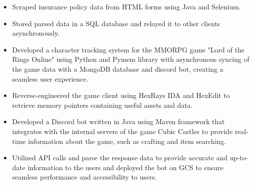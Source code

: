 \documentclass[10pt,a4paper,ragged2e]{altacv}
\begin{document}
\divider

\begin{itemize}
\item Scraped insurance policy data from HTML forms using Java and Selenium.
\item Stored parsed data in a SQL database and relayed it to other clients asynchronously.
\end{itemize}


\begin{itemize}
\item Developed a character tracking system for the MMORPG game "Lord of the Rings Online" using Python and Pymem library with asynchronous syncing of the game data with a MongoDB database and discord bot, creating a seamless user experience.
\item Reverse-engineered the game client using HexRays IDA and HexEdit to retrieve memory pointers containing useful assets and data.
\end{itemize}

\divider

\begin{itemize}
\item Developed a Discord bot written in Java using Maven framework that integrates with the internal servers of the game Cubic Castles to provide real-time information about the game, such as crafting and item searching.
\item Utilized API calls and parse the response data to provide accurate and up-to-date information to the users and deployed the bot on GCS to ensure seamless performance and accessibility to users.
\end{itemize}

\clearpage

% 
% 
% 
% 
% 
% 
% 
\end{document}

